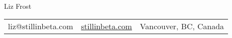 \centering
\textmd{\Huge Liz Frost} \\
\begin{tabular}{c | c | c}
liz@stillinbeta.com &
\href{https://stillinbeta.com}{stillinbeta.com} &
Vancouver, BC, Canada
\end{tabular}

\raggedright
